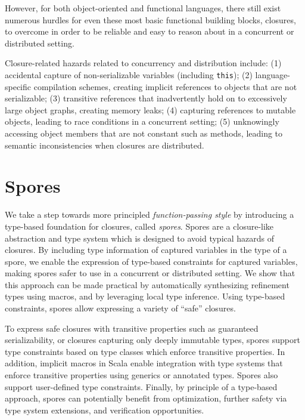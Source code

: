 \documentclass[english]{lni}
\begin{document}
However, for both object-oriented and functional languages, there still exist
numerous hurdles for even these most basic functional
building blocks, closures, to overcome in order to be reliable and easy to
reason about in a concurrent or distributed setting.

Closure-related hazards related to concurrency and distribution include: (1)
accidental capture of non-serializable variables (including \verb|this|); (2)
language-specific compilation schemes, creating implicit references to objects
that are not serializable; (3) transitive references that inadvertently hold
on to excessively large object graphs, creating memory leaks; (4) capturing
references to mutable objects, leading to race conditions in a concurrent
setting; (5) unknowingly accessing object members that are not constant such
as methods, leading to semantic inconsistencies when closures are distributed.


\vspace{-7mm}
\section{Spores}
\vspace{-5mm}
We take a step towards more principled {\em function-passing style}
by introducing a type-based foundation for closures, called {\em spores}.
Spores are a closure-like abstraction and type system which is designed to
avoid typical hazards of closures. By including type information of captured
variables in the type of a spore, we enable the expression of type-based
constraints for captured variables, making spores safer to use in a concurrent
or distributed setting. We show that this approach can be made practical by
automatically synthesizing refinement types using macros, and by leveraging
local type inference. Using type-based constraints, spores allow expressing a
variety of ``safe'' closures.

To express safe closures with transitive properties such as guaranteed
serializability, or closures capturing only deeply immutable types, spores
support type constraints based on type classes which enforce transitive
properties. In addition, implicit macros in Scala enable integration with type
systems that enforce transitive properties using generics or annotated types.
Spores also support user-defined type constraints. Finally, by principle of a
type-based approach, spores can potentially benefit from optimization, further
safety via type system extensions, and verification opportunities.
\end{document}
